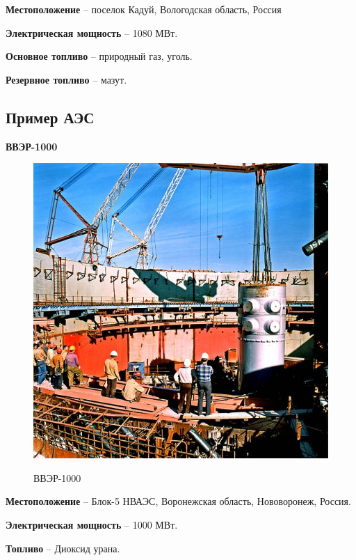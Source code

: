 \documentclass[a4paper,12pt]{article}
\begin{document}
	\newpage

	{\bf Местоположение} -- поселок Кадуй, Вологодская область, Россия
	
	{\bf Электрическая мощность} -- 1080 МВт.
	
	{\bf Основное топливо} -- природный газ, уголь.
	
	{\bf Резервное топливо} -- мазут.
	
	\subsection*{Пример АЭС}
	
	
	{\bf ВВЭР-1000}
	
	\begin{figure}[h!]
		\begin{center}
			{\includegraphics[scale = 2.0]{AES.jpg}}
			\label{AES}
		\end{center}
		\caption{ВВЭР-1000}
	\end{figure}
	
	{\bf Местоположение} -- Блок-5 НВАЭС, Воронежская область, Нововоронеж, Россия.
	
	{\bf Электрическая мощность} -- 1000 МВт.
	
	{\bf Топливо} -- Диоксид урана.
	
	\newpage
	
\end{document}
